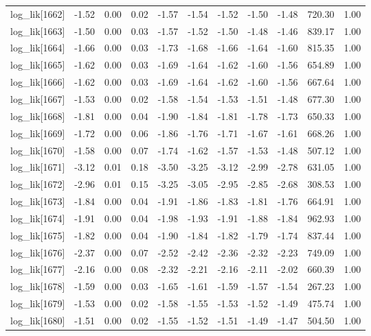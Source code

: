 \begin{table}[ht]
\begin{tabular}{rrrrrrrrrrr}
  log\_lik[1662] & -1.52 & 0.00 & 0.02 & -1.57 & -1.54 & -1.52 & -1.50 & -1.48 & 720.30 & 1.00 \\ 
  log\_lik[1663] & -1.50 & 0.00 & 0.03 & -1.57 & -1.52 & -1.50 & -1.48 & -1.46 & 839.17 & 1.00 \\ 
  log\_lik[1664] & -1.66 & 0.00 & 0.03 & -1.73 & -1.68 & -1.66 & -1.64 & -1.60 & 815.35 & 1.00 \\ 
  log\_lik[1665] & -1.62 & 0.00 & 0.03 & -1.69 & -1.64 & -1.62 & -1.60 & -1.56 & 654.89 & 1.00 \\ 
  log\_lik[1666] & -1.62 & 0.00 & 0.03 & -1.69 & -1.64 & -1.62 & -1.60 & -1.56 & 667.64 & 1.00 \\ 
  log\_lik[1667] & -1.53 & 0.00 & 0.02 & -1.58 & -1.54 & -1.53 & -1.51 & -1.48 & 677.30 & 1.00 \\ 
  log\_lik[1668] & -1.81 & 0.00 & 0.04 & -1.90 & -1.84 & -1.81 & -1.78 & -1.73 & 650.33 & 1.00 \\ 
  log\_lik[1669] & -1.72 & 0.00 & 0.06 & -1.86 & -1.76 & -1.71 & -1.67 & -1.61 & 668.26 & 1.00 \\ 
  log\_lik[1670] & -1.58 & 0.00 & 0.07 & -1.74 & -1.62 & -1.57 & -1.53 & -1.48 & 507.12 & 1.00 \\ 
  log\_lik[1671] & -3.12 & 0.01 & 0.18 & -3.50 & -3.25 & -3.12 & -2.99 & -2.78 & 631.05 & 1.00 \\ 
  log\_lik[1672] & -2.96 & 0.01 & 0.15 & -3.25 & -3.05 & -2.95 & -2.85 & -2.68 & 308.53 & 1.00 \\ 
  log\_lik[1673] & -1.84 & 0.00 & 0.04 & -1.91 & -1.86 & -1.83 & -1.81 & -1.76 & 664.91 & 1.00 \\ 
  log\_lik[1674] & -1.91 & 0.00 & 0.04 & -1.98 & -1.93 & -1.91 & -1.88 & -1.84 & 962.93 & 1.00 \\ 
  log\_lik[1675] & -1.82 & 0.00 & 0.04 & -1.90 & -1.84 & -1.82 & -1.79 & -1.74 & 837.44 & 1.00 \\ 
  log\_lik[1676] & -2.37 & 0.00 & 0.07 & -2.52 & -2.42 & -2.36 & -2.32 & -2.23 & 749.09 & 1.00 \\ 
  log\_lik[1677] & -2.16 & 0.00 & 0.08 & -2.32 & -2.21 & -2.16 & -2.11 & -2.02 & 660.39 & 1.00 \\ 
  log\_lik[1678] & -1.59 & 0.00 & 0.03 & -1.65 & -1.61 & -1.59 & -1.57 & -1.54 & 267.23 & 1.00 \\ 
  log\_lik[1679] & -1.53 & 0.00 & 0.02 & -1.58 & -1.55 & -1.53 & -1.52 & -1.49 & 475.74 & 1.00 \\ 
  log\_lik[1680] & -1.51 & 0.00 & 0.02 & -1.55 & -1.52 & -1.51 & -1.49 & -1.47 & 504.50 & 1.00 \\ 

\end{tabular}
\end{table}
